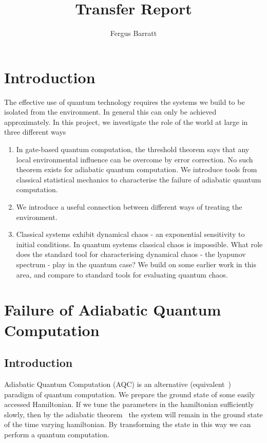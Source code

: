 \documentclass{article}
\title{Transfer Report}
\author{Fergus Barratt}
\begin{document}
\maketitle
\section{Introduction}
The effective use of quantum technology requires the systems we build to be isolated from the environment.
In general this can only be achieved approximately.
In this project, we investigate the role of the world at large in three different ways
\begin{enumerate}
    \item In gate-based quantum computation, the threshold theorem says that any local environmental influence can be overcome by error correction.
          No such theorem exists for adiabatic quantum computation. 
          We introduce tools from classical statistical mechanics to characterise the failure of adiabatic quantum computation.
    \item We introduce a useful connection between different ways of treating the environment.
    \item Classical systems exhibit dynamical chaos - an exponential sensitivity to initial conditions. 
          In quantum systems classical chaos is impossible.
          What role does the standard tool for characterising dynamical chaos - the lyapunov spectrum - play in the quantum case?
          We build on some earlier work in this area, and compare to standard tools for evaluating quantum chaos.
\end{enumerate}
%
\section{Failure of Adiabatic Quantum Computation}\label{sec:failure}
%
\subsection{Introduction}
Adiabatic Quantum Computation (AQC) is an alternative (equivalent~\cite{Aharonov2004}) paradigm of quantum computation.
We prepare the ground state of some easily accessed Hamiltonian.
If we tune the parameters in the hamiltonian sufficiently slowly, then by the adiabatic theorem~\cite{born1928adiabatic} the system will remain in the ground state of the time varying hamiltonian.
By transforming the state in this way we can perform a quantum computation.
\end{document}
